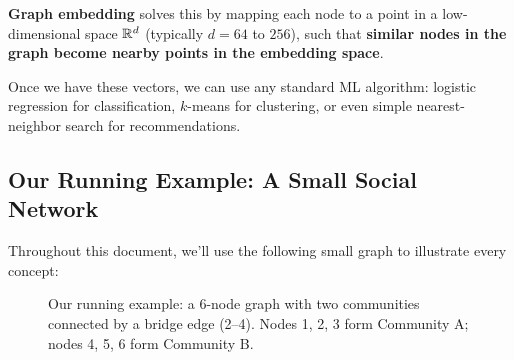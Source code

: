 \begin{notechapter}
\begin{keyinsight}
\textbf{Graph embedding} solves this by mapping each node to a point in a low-dimensional space $\mathbb{R}^d$ (typically $d = 64$ to $256$), such that \textbf{similar nodes in the graph become nearby points in the embedding space}.

Once we have these vectors, we can use any standard ML algorithm: logistic regression for classification, $k$-means for clustering, or even simple nearest-neighbor search for recommendations.
\end{keyinsight}

\subsection{Our Running Example: A Small Social Network}

Throughout this document, we'll use the following small graph to illustrate every concept:

\begin{figure}[htbp]
\centering
{}
\caption{Our running example: a 6-node graph with two communities connected by a bridge edge (2--4). Nodes 1, 2, 3 form Community A; nodes 4, 5, 6 form Community B.}
\label{shallow-embeddings:fig:running_example}
\end{figure}


\end{notechapter}
